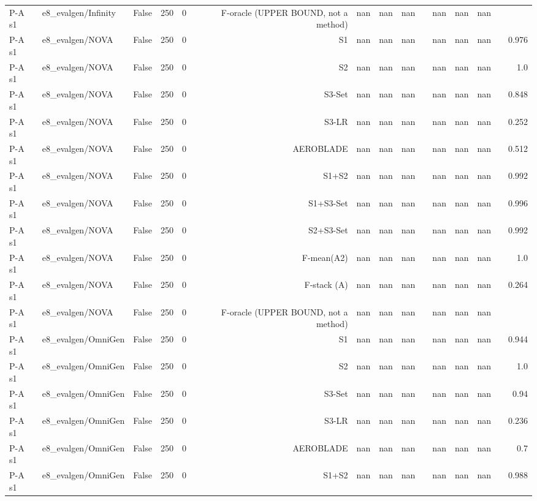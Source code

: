 \begin{table}[htbp]
\begin{tabular}{llrrrrrrrrrrrrr}
P-A s1 & e8\_evalgen/Infinity & False & 250 & 0 & F-oracle (UPPER BOUND, not a method) & nan & nan & nan &  & nan & nan & nan &  &  \\
P-A s1 & e8\_evalgen/NOVA & False & 250 & 0 & S1 & nan & nan & nan &  & nan & nan & nan &  & 0.976 \\
P-A s1 & e8\_evalgen/NOVA & False & 250 & 0 & S2 & nan & nan & nan &  & nan & nan & nan &  & 1.0 \\
P-A s1 & e8\_evalgen/NOVA & False & 250 & 0 & S3-Set & nan & nan & nan &  & nan & nan & nan &  & 0.848 \\
P-A s1 & e8\_evalgen/NOVA & False & 250 & 0 & S3-LR & nan & nan & nan &  & nan & nan & nan &  & 0.252 \\
P-A s1 & e8\_evalgen/NOVA & False & 250 & 0 & AEROBLADE & nan & nan & nan &  & nan & nan & nan &  & 0.512 \\
P-A s1 & e8\_evalgen/NOVA & False & 250 & 0 & S1+S2 & nan & nan & nan &  & nan & nan & nan &  & 0.992 \\
P-A s1 & e8\_evalgen/NOVA & False & 250 & 0 & S1+S3-Set & nan & nan & nan &  & nan & nan & nan &  & 0.996 \\
P-A s1 & e8\_evalgen/NOVA & False & 250 & 0 & S2+S3-Set & nan & nan & nan &  & nan & nan & nan &  & 0.992 \\
P-A s1 & e8\_evalgen/NOVA & False & 250 & 0 & F-mean(A2) & nan & nan & nan &  & nan & nan & nan &  & 1.0 \\
P-A s1 & e8\_evalgen/NOVA & False & 250 & 0 & F-stack (A) & nan & nan & nan &  & nan & nan & nan &  & 0.264 \\
P-A s1 & e8\_evalgen/NOVA & False & 250 & 0 & F-oracle (UPPER BOUND, not a method) & nan & nan & nan &  & nan & nan & nan &  &  \\
P-A s1 & e8\_evalgen/OmniGen & False & 250 & 0 & S1 & nan & nan & nan &  & nan & nan & nan &  & 0.944 \\
P-A s1 & e8\_evalgen/OmniGen & False & 250 & 0 & S2 & nan & nan & nan &  & nan & nan & nan &  & 1.0 \\
P-A s1 & e8\_evalgen/OmniGen & False & 250 & 0 & S3-Set & nan & nan & nan &  & nan & nan & nan &  & 0.94 \\
P-A s1 & e8\_evalgen/OmniGen & False & 250 & 0 & S3-LR & nan & nan & nan &  & nan & nan & nan &  & 0.236 \\
P-A s1 & e8\_evalgen/OmniGen & False & 250 & 0 & AEROBLADE & nan & nan & nan &  & nan & nan & nan &  & 0.7 \\
P-A s1 & e8\_evalgen/OmniGen & False & 250 & 0 & S1+S2 & nan & nan & nan &  & nan & nan & nan &  & 0.988 \\

\end{tabular}
\end{table}
